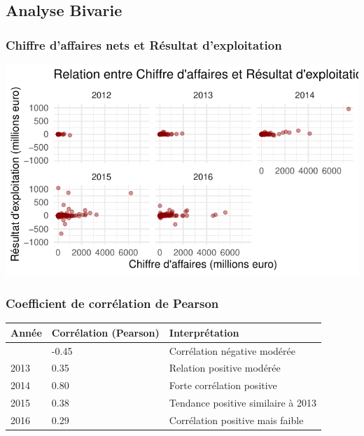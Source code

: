 \documentclass[mstat,12pt]{unswthesis}
\begin{document}
\newpage

\subsection{Analyse Bivarie}\label{analyse-bivarie}

\medskip

\subsubsection{Chiffre d'affaires nets et Résultat
d'exploitation}\label{chiffre-daffaires-nets-et-ruxe9sultat-dexploitation}

\includegraphics{TDDT_projet_L_2_files/figure-latex/nuage_point_anness-1.pdf}

\subsubsection{Coefficient de corrélation de
Pearson}\label{coefficient-de-corruxe9lation-de-pearson}

\medskip

\begin{longtable}[]{@{}lll@{}}
\toprule\noalign{}
Année & Corrélation (Pearson) & Interprétation \\
\midrule\noalign{}
\endhead
\bottomrule\noalign{}
\endlastfoot
2012 & -0.45 & Corrélation négative modérée \\
2013 & 0.35 & Relation positive modérée \\
2014 & 0.80 & Forte corrélation positive \\
2015 & 0.38 & Tendance positive similaire à 2013 \\
2016 & 0.29 & Corrélation positive mais faible \\
\end{longtable}
\end{document}
